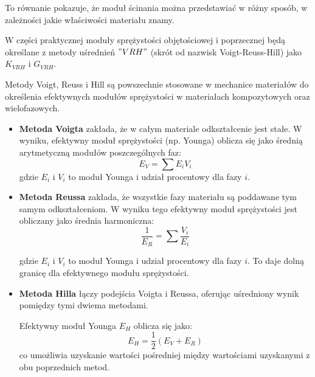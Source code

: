 To równanie pokazuje, że moduł ścinania można przedstawiać w różny sposób, w zależności jakie właściwości materiału znamy. 

\clearpage





W części praktycznej moduły sprężystości objętościowej i poprzecznej będą określane z metody uśrednień $"V R H"$ (skrót od nazwisk Voigt-Reuss-Hill) jako $K_{VRH}$ i $G_{VRH}$.



Metody Voigt, Reuss i Hill \cite{alma991000386409708832, url_sparrow_przegl_papier_2024_05} są powszechnie stosowane w mechanice materiałów do określenia efektywnych modułów sprężystości w materiałach kompozytowych oraz wielofazowych.

\begin{itemize}

  \item {\textbf{Metoda Voigta} zakłada, że w całym materiale odkształcenie jest stałe. W wyniku, efektywny moduł sprężystości (np. Younga) oblicza się jako średnią arytmetyczną modułów poszczególnych faz:
$$
  E_V = \sum{E_iV_i}
$$
gdzie $E_i$ i $V_i$ to moduł Younga i udział procentowy dla fazy $i$.}

  \item {\textbf{Metoda Reussa} zakłada, że wszystkie fazy materiału są poddawane tym samym odkształceniom. W wyniku tego efektywny moduł sprężystości jest obliczany jako średnia harmoniczna:
  $$
  \frac{1}{E_R} = \sum\frac{V_i}{E_i}
  $$

gdzie $E_i$ i $V_i$ to moduł Younga i udział procentowy dla fazy $i$.
To daje dolną granicę dla efektywnego modułu sprężystości.}
  \item {\textbf{Metoda Hilla} łączy podejścia Voigta i Reussa, oferując uśredniony wynik pomiędzy tymi dwiema metodami. 

Efektywny moduł Younga $E_H$ oblicza się jako:
  $$
  E_H = \frac{1}{2}\left(E_V + E_R\right)
  $$
  co umożliwia uzyskanie wartości pośredniej między wartościami uzyskanymi z obu poprzednich metod.
}

\end{itemize}

\clearpage